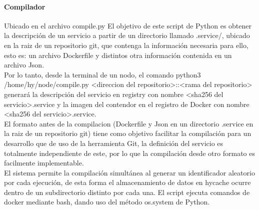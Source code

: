 \documentclass[11pt]{article}
\begin{document}
			\paragraph{Compilador}
				Ubicado en el archivo compile.py
				El objetivo de este script de Python es obtener la descripción de un servicio a partir de un directorio llamado .service/, ubicado en la raiz de un repositorio git, 
				que contenga la información necesaria para ello, esto es: un archivo Dockerfile y distintos otra información contenida en un archivo Json. \\
				Por lo tanto, desde la terminal de un nodo, el comando python3 /home/hy/node/compile.py <direccion del repositorio>::<rama del repositorio> generará la descripción del servicio
				en registry con nombre <sha256 del servicio>.service y la imagen del contendor en el registro de Docker con nombre <sha256 del servicio>.service. \\
				El formato antes de la compilacion (Dockerfile y Json en un directorio .service en la raiz de un repositorio git) tiene como objetivo facilitar la compilación para un desarrollo que
				de uso de la herramienta Git, la definición del servicio es totalmente independiente de este, por lo que la compilación desde otro formato es facilmente implementable. \\
				El sistema permite la compilación simultánea al generar un identificador aleatorio por cada ejecución, de esta forma el almacenamiento de datos en hycache ocurre dentro de un subdirectorio
				distinto por cada una. El script ejecuta comandos de docker mediante bash, dando uso del método os.system de Python. \\
\end{document}
